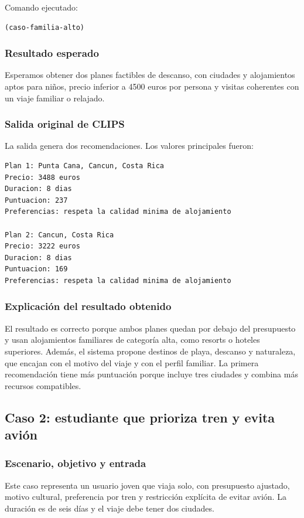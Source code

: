 \documentclass[11pt,a4paper]{article}
\begin{document}
Comando ejecutado:
\begin{verbatim}
(caso-familia-alto)
\end{verbatim}

\subsubsection{Resultado esperado}
Esperamos obtener dos planes factibles de descanso, con ciudades y alojamientos
aptos para ni\~nos, precio inferior a 4500 euros por persona y visitas
coherentes con un viaje familiar o relajado.

\subsubsection{Salida original de CLIPS}
La salida genera dos recomendaciones. Los valores principales fueron:
\begin{verbatim}
Plan 1: Punta Cana, Cancun, Costa Rica
Precio: 3488 euros
Duracion: 8 dias
Puntuacion: 237
Preferencias: respeta la calidad minima de alojamiento

Plan 2: Cancun, Costa Rica
Precio: 3222 euros
Duracion: 8 dias
Puntuacion: 169
Preferencias: respeta la calidad minima de alojamiento
\end{verbatim}

\subsubsection{Explicaci\'on del resultado obtenido}
El resultado es correcto porque ambos planes quedan por debajo del presupuesto
y usan alojamientos familiares de categor\'ia alta, como resorts o hoteles
superiores. Adem\'as, el sistema propone destinos de playa, descanso y
naturaleza, que encajan con el motivo del viaje y con el perfil familiar. La
primera recomendaci\'on tiene m\'as puntuaci\'on porque incluye tres ciudades y
combina m\'as recursos compatibles.

\subsection{Caso 2: estudiante que prioriza tren y evita avi\'on}
\subsubsection{Escenario, objetivo y entrada}
Este caso representa un usuario joven que viaja solo, con presupuesto ajustado,
motivo cultural, preferencia por tren y restricci\'on expl\'icita de evitar
avi\'on. La duraci\'on es de seis d\'ias y el viaje debe tener dos ciudades.
\end{document}
